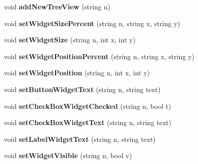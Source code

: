 \begin{DoxyCompactItemize}
\mbox{\label{classdarksun_1_1_u_i_wrangler_ac59a1e33b0a25f8c149aee699d3b4c5d}} 
void {\bfseries add\+New\+Tree\+View} (string n)
\item 
\mbox{\label{classdarksun_1_1_u_i_wrangler_a416f86347f91fda91bd7609f7859af40}} 
void {\bfseries set\+Widget\+Size\+Percent} (string n, string x, string y)
\item 
\mbox{\label{classdarksun_1_1_u_i_wrangler_a196fad2964686b468430553234bfc87d}} 
void {\bfseries set\+Widget\+Size} (string n, int x, int y)
\item 
\mbox{\label{classdarksun_1_1_u_i_wrangler_a5587a464b14b8cfe9d5171cafeafcba0}} 
void {\bfseries set\+Widget\+Position\+Percent} (string n, string x, string y)
\item 
\mbox{\label{classdarksun_1_1_u_i_wrangler_ae00bb06df8f2193693263f921d434e65}} 
void {\bfseries set\+Widget\+Position} (string n, int x, int y)
\item 
\mbox{\label{classdarksun_1_1_u_i_wrangler_a894ac3f61ae46bc9cb9f33e3aeb3738c}} 
void {\bfseries set\+Button\+Widget\+Text} (string n, string text)
\item 
\mbox{\label{classdarksun_1_1_u_i_wrangler_a103ffcfa6d1fd8e2417e1b434e47f26d}} 
void {\bfseries set\+Check\+Box\+Widget\+Checked} (string n, bool t)
\item 
\mbox{\label{classdarksun_1_1_u_i_wrangler_acee4ef12733106fc00ed2f47f0858623}} 
void {\bfseries set\+Check\+Box\+Widget\+Text} (string n, string text)
\item 
\mbox{\label{classdarksun_1_1_u_i_wrangler_ab0b0d0c34bfa295ce25e2052e617ce51}} 
void {\bfseries set\+Label\+Widget\+Text} (string n, string text)
\item 
\mbox{\label{classdarksun_1_1_u_i_wrangler_a38634fa3abf8895fec5b471c07e0564b}} 
void {\bfseries set\+Widget\+Visible} (string n, bool v)

\end{DoxyCompactItemize}
